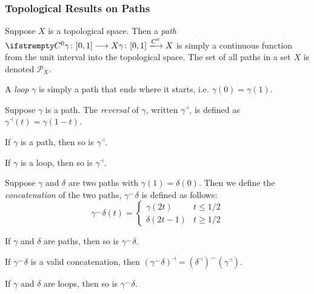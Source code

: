 \subsubsection{Topological Results on Paths}
\begin{definition}[Path]
Suppose $X$ is a topological space. Then a \emph{path} $\fn{\gamma}{[0,1]}{X}[C^0]$ is simply a continuous function from the unit interval into the topological space. The set of all paths in a set $X$ is denoted $\mathcal{P}_X$.
\end{definition}
\begin{definition}[Loop]
A \emph{loop} $\gamma$ is simply a path that ends where it starts, i.e. $\gamma(0) = \gamma(1)$.
\end{definition}
\begin{definition}
Suppose $\gamma$ is a path. The \emph{reversal} of $\gamma$, written $\gamma^\dashv$, is defined as $\gamma^\dashv (t) = \gamma (1-t)$.
\end{definition}
\begin{lemma}
If $\gamma$ is a path, then so is $\gamma^\dashv$.
\end{lemma}
\begin{lemma}
If $\gamma$ is a loop, then so is $\gamma^\dashv$.
\end{lemma}
\begin{definition}
Suppose $\gamma$ and $\delta$ are two paths with $\gamma(1)=\delta(0)$. Then we define the \emph{concatenation} of the two paths, $\gamma^\frown\delta$ is defined as follows:
\begin{equation*}
\gamma^\frown\delta(t) = 
\begin{cases}
\gamma(2t) & t \leq 1/2\\
\delta(2t-1) & t \geq 1/2
\end{cases}
\end{equation*}
\end{definition}
\begin{lemma}
If $\gamma$ and $\delta$ are paths, then so is $\gamma^\frown\delta$.
\end{lemma}
\begin{lemma}
If $\gamma^\frown\delta$ is a valid concatenation, then $(\gamma^\frown\delta)^\dashv = (\delta^\dashv)^\frown(\gamma^\dashv)$.
\end{lemma}
\begin{lemma}
If $\gamma$ and $\delta$ are loops, then so is $\gamma^\frown\delta$.
\end{lemma}
